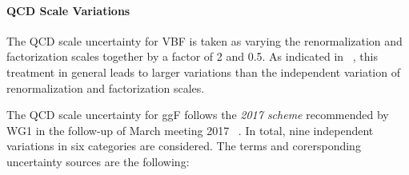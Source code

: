 %
%

% 

\paragraph{QCD Scale Variations}

The QCD scale uncertainty for VBF is taken as varying the renormalization
and factorization scales together by a factor of 2 and 0.5. As indicated in ~\cite{QCDscale_vbf}, 
this treatment in general leads to larger variations than the independent variation of renormalization
and factorization scales. 

The QCD scale uncertainty for ggF follows the \textit{2017 scheme} recommended by 
WG1 in the follow-up of March meeting 2017 ~\cite{QCDscale_ggF}. In total, nine independent 
variations in six categories are considered. The terms and corersponding uncertainty sources 
are the following:

